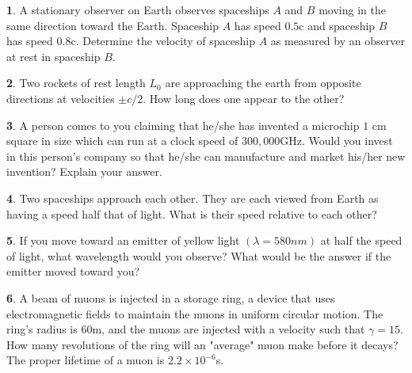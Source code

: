 \documentclass[10pt, twocolumn]{article}
\theoremstyle{definition}
\newtheorem{q}{}
\begin{document}
		\begin{q}
			A stationary observer on Earth observes spaceships $ A $ and $ B $ moving in the same direction toward the Earth. Spaceship $ A $ has speed $ 0.5 $c and spaceship $ B $ has speed $ 0.8 $c. Determine the velocity of spaceship $ A $ as measured by an observer at rest in spaceship $ B $.
		\end{q}
		\begin{q}
			Two rockets of rest length $ L_0 $ are approaching the earth from opposite directions at velocities $ \pm c/2 $. How long does one appear to the other?
		\end{q}
		\begin{q}
			A person comes to you claiming that he/she has invented a microchip $ 1 $ cm square in size which can run at a clock speed of $ 300,000  $GHz.
			Would you invest in this person's company so that he/she can manufacture and market his/her new invention? Explain your answer. 
		\end{q}
		\begin{q}
			Two spaceships approach each other. They are each viewed from Earth as having a speed half that of light. What is their speed relative to each other?
		\end{q}
		\begin{q}
			If you move toward an emitter of yellow light $ (\lambda = 580nm) $ at half the speed of light, what wavelength would you observe? What would be the answer if the emitter moved toward you?
		\end{q}
		\begin{q}
			A beam of muons is injected in a storage ring, a device that uses electromagnetic fields to maintain the muons in uniform circular motion. The ring's radius is $ 60 $m, and the muons are injected with a velocity such that $ \gamma = 15 $. How many revolutions of the ring will an "average" muon make before it decays? The proper lifetime of a muon is $ 2.2 \times 10^{-6} $s.
		\end{q}
\end{document}
